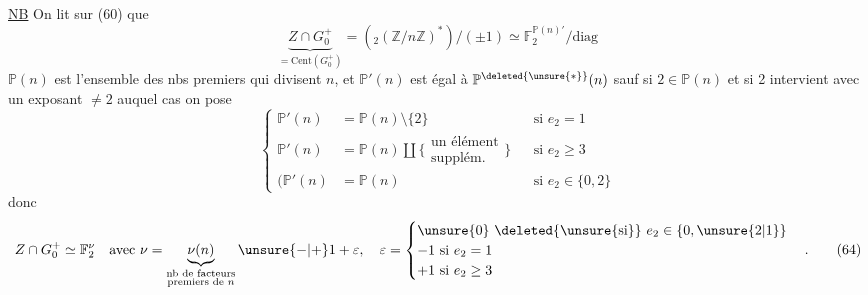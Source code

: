 \uline{NB} On lit sur (60) que
\[
\underbrace{Z\cap G_0^+}_{=\mathrm{Cent}(G_0^+)}=
({}_2(\mathbb Z/n\mathbb Z)^*)/(\pm1)\simeq\mathbb F_2^{\mathbb P(n)'}/\mathrm{diag}
\tag*{(62)}
\]
$\mathbb P(n)$ est l'ensemble des nbs premiers  qui divisent $n$, et $\mathbb P'(n)$ est égal à $\mathbb P^{\deleted{\unsure{*}}}(n)$ sauf si $2\in\mathbb P(n)$ et si 2 intervient avec un  exposant  $\ne2$  auquel cas on pose
\[
\left\{\begin{aligned}
\mathbb P'(n)&=\mathbb P(n)\setminus\{2\}&&\text{si }e_2=1\\
\mathbb P'(n)&=\mathbb P(n)\amalg\{\substack{\text{un élément}\\\text{supplém.}}\}&&\text{si }e_2\ge3\\
(\mathbb P'(n)&=\mathbb P(n)&&\text{si }e_2\in\{0,2\}
\end{aligned}\right.\tag*{(63)}
\]
donc
\[
Z\cap G_0^+\simeq\mathbb F_2^\nu\quad\text{avec }\nu=
\underbrace{\nu(n)}_{\substack{\text{nb de facteurs}\\\text{premiers de }n}}
\unsure{-|+}1+\varepsilon,\quad\varepsilon=
\begin{cases}
\unsure{0}\ \deleted{\unsure{\text{si}}}\ e_2\in\{0,\unsure{2|1}\}\\
-1\ \text{si }e_2=1\\
+1\ \text{si }e_2\ge3
\end{cases}.
\tag*{(64)}
\]
